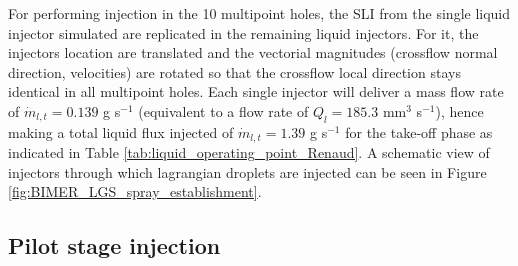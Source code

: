 For performing injection in the 10 multipoint holes, the SLI from the single liquid injector simulated are replicated in the remaining liquid injectors. For it, the injectors location are translated and the vectorial magnitudes (crossflow normal direction, velocities) are rotated so that the crossflow local direction stays identical in all multipoint holes. Each single injector will deliver a mass flow rate of $\dot{m}_{l,t} = 0.139$ g s$^{-1}$ (equivalent to a flow rate of $Q_l = 185.3$ mm$^3$ s$^{-1}$), hence making a total liquid flux injected of $\dot{m}_{l,t} = 1.39$ g s$^{-1}$ for the take-off phase as indicated in Table \ref{tab:liquid_operating_point_Renaud}. A schematic view of injectors through which lagrangian droplets are injected can be seen in Figure \ref{fig:BIMER_LGS_spray_establishment}.


%




\subsection{Pilot stage injection}

